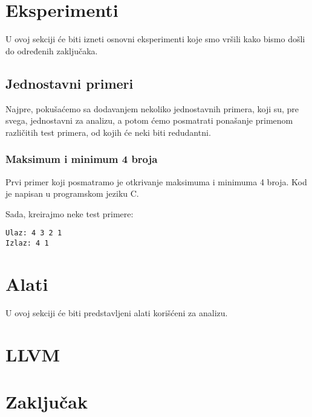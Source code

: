 \documentclass[a4paper]{article}
\begin{document}
\section{Eksperimenti}
\label{sec:first}
U ovoj sekciji će biti izneti osnovni eksperimenti koje smo vršili kako bismo došli do određenih zaključaka.

\subsection{Jednostavni primeri}
\label{sec:simpleexamples}

Najpre, pokušaćemo sa dodavanjem nekoliko jednostavnih primera, koji su, pre svega, jednostavni za analizu, a potom ćemo posmatrati ponašanje primenom različitih test primera, od kojih će neki biti redudantni.

\subsubsection{Maksimum i minimum 4 broja}
Prvi primer koji posmatramo je otkrivanje maksimuma i minimuma 4 broja. Kod je napisan u programskom jeziku C.



Sada, kreirajmo neke test primere:
\begin{verbatim}
Ulaz: 4 3 2 1  
Izlaz: 4 1
\end{verbatim}

\section{Alati}
\label{sec:tools}

U ovoj sekciji će biti predstavljeni alati korišćeni za analizu.

\section{LLVM}
\label{sec:llvm}


\section{Zaključak}
\label{sec:zakljucak}

\appendix
 

\end{document}
